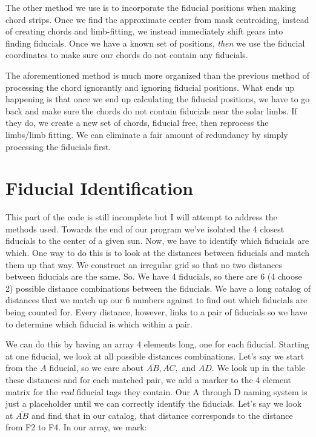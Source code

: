 \documentclass[10pt]{scrartcl}
\begin{document}
The other method we use is to incorporate the fiducial positions when making chord strips. Once we find the approximate center from mask centroiding, instead of creating chords and limb-fitting, we instead immediately shift gears into finding fiducials. Once we have a known set of positions, \emph{then} we use the fiducial coordinates to make sure our chords do not contain any fiducials. 

The aforementioned method is much more organized than the previous method of processing the chord ignorantly and ignoring fiducial positions. What ends up happening is that once we end up calculating the fiducial positions, we have to go back and make sure the chords do not contain fiducials near the solar limbs. If they do, we create a new set of chords, fiducial free, then reprocess the limbs/limb fitting. We can eliminate a fair amount of redundancy by simply processing the fiducials first. 


\clearpage


\section{Fiducial Identification} %
\label{sec:fiducial_identification}
This part of the code is still incomplete but I will attempt to address the methods used. Towards the end of our program we've isolated the 4 closest fiducials to the center of a given sun. Now, we have to identify which fiducials are which. One way to do this is to look at the distances between fiducials and match them up that way. We construct an irregular grid so that no two distances between fiducials are the same. So. We have 4 fiducials, so there are 6 (4 choose 2) possible distance combinations between the fiducials. We have a long catalog of distances that we match up our 6 numbers against to find out which fiducials are being counted for. Every distance, however, links to a pair of fiducials so we have to determine which fiducial is which within a pair. 

We can do this by having an array 4 elements long, one for each fiducial. Starting at one fiducial, we look at all possible distances combinations. Let's say we start from the $A$ fiducial, so we care about $\overline{AB},\overline{AC},$ and $\overline{AD}$. We look up in the table these distances and for each matched pair, we add a marker to the 4 element matrix for the \emph{real} fiducial tags they contain. Our A through D naming system is just a placeholder until we can correctly identify the fiducials. Let's say we look at $\overline{AB}$ and find that in our catalog, that distance corresponds to the distance from F2 to F4. In our array, we mark:
\end{document}

